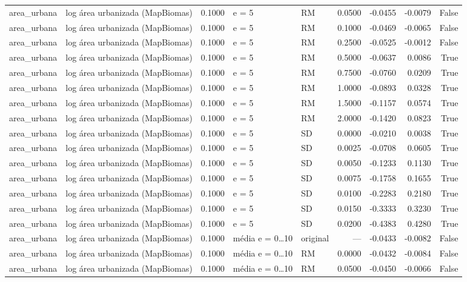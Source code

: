 \begin{table}
{\begin{tabular}{llrllrrrr}
area\_urbana & log área urbanizada (MapBiomas) & 0.1000 & e = 5 & RM & 0.0500 & -0.0455 & -0.0079 & False \\
area\_urbana & log área urbanizada (MapBiomas) & 0.1000 & e = 5 & RM & 0.1000 & -0.0469 & -0.0065 & False \\
area\_urbana & log área urbanizada (MapBiomas) & 0.1000 & e = 5 & RM & 0.2500 & -0.0525 & -0.0012 & False \\
area\_urbana & log área urbanizada (MapBiomas) & 0.1000 & e = 5 & RM & 0.5000 & -0.0637 & 0.0086 & True \\
area\_urbana & log área urbanizada (MapBiomas) & 0.1000 & e = 5 & RM & 0.7500 & -0.0760 & 0.0209 & True \\
area\_urbana & log área urbanizada (MapBiomas) & 0.1000 & e = 5 & RM & 1.0000 & -0.0893 & 0.0328 & True \\
area\_urbana & log área urbanizada (MapBiomas) & 0.1000 & e = 5 & RM & 1.5000 & -0.1157 & 0.0574 & True \\
area\_urbana & log área urbanizada (MapBiomas) & 0.1000 & e = 5 & RM & 2.0000 & -0.1420 & 0.0823 & True \\
area\_urbana & log área urbanizada (MapBiomas) & 0.1000 & e = 5 & SD & 0.0000 & -0.0210 & 0.0038 & True \\
area\_urbana & log área urbanizada (MapBiomas) & 0.1000 & e = 5 & SD & 0.0025 & -0.0708 & 0.0605 & True \\
area\_urbana & log área urbanizada (MapBiomas) & 0.1000 & e = 5 & SD & 0.0050 & -0.1233 & 0.1130 & True \\
area\_urbana & log área urbanizada (MapBiomas) & 0.1000 & e = 5 & SD & 0.0075 & -0.1758 & 0.1655 & True \\
area\_urbana & log área urbanizada (MapBiomas) & 0.1000 & e = 5 & SD & 0.0100 & -0.2283 & 0.2180 & True \\
area\_urbana & log área urbanizada (MapBiomas) & 0.1000 & e = 5 & SD & 0.0150 & -0.3333 & 0.3230 & True \\
area\_urbana & log área urbanizada (MapBiomas) & 0.1000 & e = 5 & SD & 0.0200 & -0.4383 & 0.4280 & True \\
area\_urbana & log área urbanizada (MapBiomas) & 0.1000 & média e = 0…10 & original & — & -0.0433 & -0.0082 & False \\
area\_urbana & log área urbanizada (MapBiomas) & 0.1000 & média e = 0…10 & RM & 0.0000 & -0.0432 & -0.0084 & False \\
area\_urbana & log área urbanizada (MapBiomas) & 0.1000 & média e = 0…10 & RM & 0.0500 & -0.0450 & -0.0066 & False \\

\end{tabular}}
\end{table}
